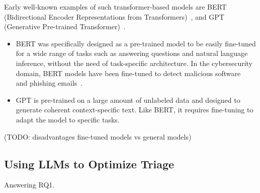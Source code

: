 Early well-known examples of such transformer-based models are BERT
(Bidirectional Encoder Representations from Transformers)\ \citep{devlin2018bert}, and
GPT (Generative Pre-trained Transformer)\ \citep{radford2018improving}.
\begin{itemize}
    \item BERT was specifically designed as a pre-trained model to be easily fine-tuned for a wide range of tasks such
    as answering questions and natural language inference, without the need of task-specific architecture.
    In the cybersecurity domain, BERT models have been fine-tuned to detect malicious
    software\ \citep{rahali2021malbert} and phishing emails\ \citep{lee2020catbert}.
    \item GPT is pre-trained on a large amount of unlabeled data and designed to generate coherent context-specific
    text.
    Like BERT, it requires fine-tuning to adapt the model to specific tasks.
\end{itemize}

(TODO: disadvantages fine-tuned models vs general models) %

\subsection{Using LLMs to Optimize Triage}
\label{subsec:rq1-llms-in-context}

Answering RQ1.